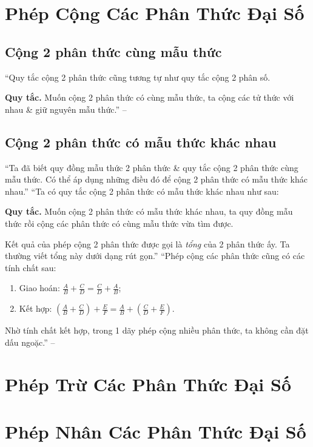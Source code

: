 \documentclass[oneside]{book}
\numberwithin{equation}{section}
\begin{document}
\section{Phép Cộng Các Phân Thức Đại Số}

\subsection{Cộng 2 phân thức cùng mẫu thức}
``Quy tắc cộng 2 phân thức cũng tương tự như quy tắc cộng 2 phân số.

\textbf{Quy tắc.} Muốn cộng 2 phân thức có cùng mẫu thức, ta cộng các tử thức với nhau \& giữ nguyên mẫu thức.'' -- \cite[p. 44]{SGK_Toan_8_tap_1}

\subsection{Cộng 2 phân thức có mẫu thức khác nhau}
``Ta đã biết quy đồng mẫu thức 2 phân thức \& quy tắc cộng 2 phân thức cùng mẫu thức. Có thể áp dụng những điều đó để cộng 2 phân thức có mẫu thức khác nhau.'' ``Ta có quy tắc cộng 2 phân thức có mẫu thức khác nhau như sau:

\textbf{Quy tắc.} Muốn cộng 2 phân thức có mẫu thức khác nhau, ta quy đồng mẫu thức rồi cộng các phân thức có cùng mẫu thức vừa tìm được.

Kết quả của phép cộng 2 phân thức được gọi là \textit{tổng} của 2 phân thức ấy. Ta thường viết tổng này dưới dạng rút gọn.'' ``Phép cộng các phân thức cũng có các tính chất sau:
\begin{enumerate}
	\item Giao hoán: $\frac{A}{B} + \frac{C}{D} = \frac{C}{D} + \frac{A}{B}$;
	\item Kết hợp: $\left(\frac{A}{B} + \frac{C}{D}\right) + \frac{E}{F} = \frac{A}{B} + \left(\frac{C}{D} + \frac{E}{F}\right)$.
\end{enumerate}
Nhờ tính chất kết hợp, trong 1 dãy phép cộng nhiều phân thức, ta không cần đặt dấu ngoặc.'' -- \cite[p. 45]{SGK_Toan_8_tap_1}

\section{Phép Trừ Các Phân Thức Đại Số}

\section{Phép Nhân Các Phân Thức Đại Số}
\end{document}
